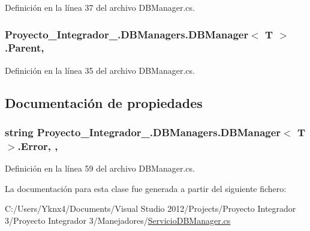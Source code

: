Definición en la línea 37 del archivo D\-B\-Manager.\-cs.

\hypertarget{class_proyecto___integrador__3_1_1_d_b_managers_1_1_d_b_manager_3_01_t_01_4_a06315e75298c8f2fd46f32dc7c9a80b2}{
\subsubsection[{Parent}]{ Proyecto\-\_\-\-Integrador\-\_.\-D\-B\-Managers.\-D\-B\-Manager$<$ T $>$.Parent\hspace{0.3cm}{\ttfamily [protected]}, {\ttfamily [inherited]}}}\label{class_proyecto___integrador__3_1_1_d_b_managers_1_1_d_b_manager_3_01_t_01_4_a06315e75298c8f2fd46f32dc7c9a80b2}


Definición en la línea 35 del archivo D\-B\-Manager.\-cs.



\subsection{Documentación de propiedades}
\hypertarget{class_proyecto___integrador__3_1_1_d_b_managers_1_1_d_b_manager_3_01_t_01_4_a6e5caaed2ee1a4d067dfbf5aaa1b1fa8}{
\subsubsection[{Error}]{\setlength{\rightskip}{0pt plus 5cm}string Proyecto\-\_\-\-Integrador\-\_.\-D\-B\-Managers.\-D\-B\-Manager$<$ T $>$.Error\hspace{0.3cm}{\ttfamily [get]}, {\ttfamily [set]}, {\ttfamily [inherited]}}}\label{class_proyecto___integrador__3_1_1_d_b_managers_1_1_d_b_manager_3_01_t_01_4_a6e5caaed2ee1a4d067dfbf5aaa1b1fa8}


Definición en la línea 59 del archivo D\-B\-Manager.\-cs.



La documentación para esta clase fue generada a partir del siguiente fichero\-:\begin{DoxyCompactItemize}
\item 
C\-:/\-Users/\-Yknx4/\-Documents/\-Visual Studio 2012/\-Projects/\-Proyecto Integrador 3/\-Proyecto Integrador 3/\-Manejadores/\hyperlink{_servicio_d_b_manager_8cs}{Servicio\-D\-B\-Manager.\-cs}\end{DoxyCompactItemize}
